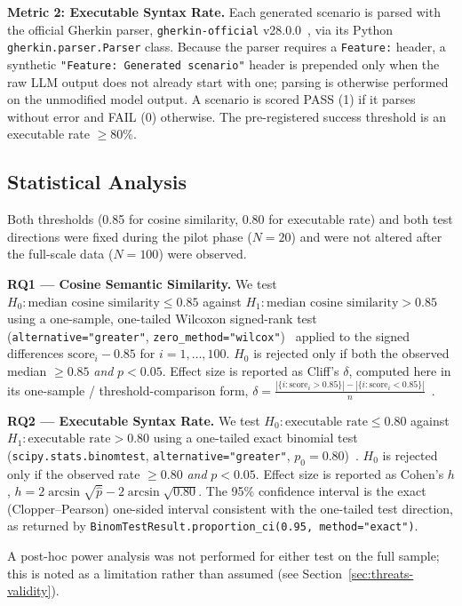 \textbf{Metric 2: Executable Syntax Rate.}
Each generated scenario is parsed with the official Gherkin parser, \texttt{gherkin-official} v28.0.0~\cite{cucumber2023gherkin}, via its Python \texttt{gherkin.parser.Parser} class.
Because the parser requires a \texttt{Feature:} header, a synthetic \texttt{"Feature: Generated scenario"} header is prepended only when the raw LLM output does not already start with one; parsing is otherwise performed on the unmodified model output.
A scenario is scored PASS (1) if it parses without error and FAIL (0) otherwise.
The pre-registered success threshold is an executable rate $\geq 80\%$.

\subsection{Statistical Analysis}
\label{sec:stats}

Both thresholds (0.85 for cosine similarity, 0.80 for executable rate) and both test directions were fixed during the pilot phase ($N{=}20$) and were not altered after the full-scale data ($N{=}100$) were observed.

\textbf{RQ1 --- Cosine Semantic Similarity.}
We test $H_0: \text{median cosine similarity} \leq 0.85$ against $H_1: \text{median cosine similarity} > 0.85$ using a one-sample, one-tailed Wilcoxon signed-rank test (\texttt{alternative="greater"}, \texttt{zero\_method="wilcox"})~\cite{wilcoxon1945} applied to the signed differences $\text{score}_i - 0.85$ for $i = 1, \dots, 100$.
$H_0$ is rejected only if both the observed median $\geq 0.85$ \emph{and} $p < 0.05$.
Effect size is reported as Cliff's $\delta$, computed here in its one-sample / threshold-comparison form, $\delta = \frac{|\{i : \text{score}_i > 0.85\}| - |\{i : \text{score}_i < 0.85\}|}{n}$~\cite{arcuri2011practical}.

\textbf{RQ2 --- Executable Syntax Rate.}
We test $H_0: \text{executable rate} \leq 0.80$ against $H_1: \text{executable rate} > 0.80$ using a one-tailed exact binomial test (\texttt{scipy.stats.binomtest}, \texttt{alternative="greater"}, $p_0=0.80$)~\cite{arcuri2011practical}.
$H_0$ is rejected only if the observed rate $\geq 0.80$ \emph{and} $p < 0.05$.
Effect size is reported as Cohen's $h$, $h = 2\arcsin\sqrt{\hat{p}} - 2\arcsin\sqrt{0.80}$.
The 95\% confidence interval is the exact (Clopper--Pearson) one-sided interval consistent with the one-tailed test direction, as returned by \texttt{BinomTestResult.proportion\_ci(0.95, method="exact")}.

A post-hoc power analysis was not performed for either test on the full sample; this is noted as a limitation rather than assumed (see Section~\ref{sec:threats-validity}).
